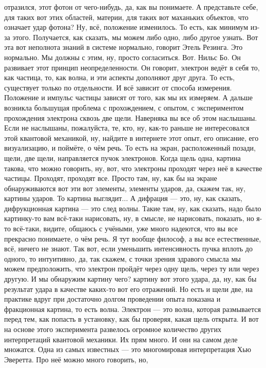отразился, этот фотон от чего-нибудь, да, как вы понимаете. А представьте себе,
для таких вот этих областей, материи, для таких вот маханьких объектов, что
означает удар фотона? Ну, всё, положение изменилось. То есть, как минимум из-за
этого. Получается, как сказать, мы можем либо одно, либо другое узнать. Вот эта
вот неполнота знаний в системе нормально, говорит Этель Резинга. Это нормально.
Мы должны с этим, ну, просто согласиться. Вот. Нильс Бо. Он развивает этот
принцип неопределенности. Он говорит, электрон ведёт в себя то, как частица, то,
как волна, и эти аспекты дополняют друг друга. То есть, существует только по
отдельности. И всё зависит от способа измерения. Положение и импульс частицы
зависят от того, как мы их измеряем. А дальше возникла большущая проблема с
прохождением, с опытом, с экспериментом прохождения электрона сквозь две щели.
Наверняка вы все об этом наслышаны. Если не наслышаны, пожалуйста, те, кто, ну,
как-то раньше не интересовался этой квантовой механикой, ну, найдите в интернете
этот опыт, его описание, его визуализацию, и поймёте, о чём речь. То есть на
экран, расположенный позади, щели, две щели, направляется пучок электронов.
Когда щель одна, картина такова, что можно говорить, ну, вот, что электроны
проходят через неё в качестве частицы. Проходят, проходят все. Просто там, ну,
как бы на экране обнаруживаются вот эти вот элементы, элементы ударов, да,
скажем так, ну, картины ударов. То картина выглядит... А дифрация — это, ну, как
сказать, дифрукционная картина — это след волны. Такие там, ну, как сказать,
надо было картинку-то вам всё-таки нарисовать, ну, в смысле, не нарисовать,
показать, но я-то всё-таки, видите, общаюсь с учёными, уже много надеются, что
вы все прекрасно понимаете, о чём речь. Я тут вообще философ, а вы все
естественные, всё, ничего не знают. Так вот, если уменьшить интенсивность пучка
вплоть до одного, то интуитивно, да, так скажем, с точки зрения здравого смысла
мы можем предположить, что электрон пройдёт через одну щель, через ту или через
другую. И мы обнаружим картину чего? картину вот этого удара, да, ну, как бы
результат удара в качестве каких-то вот его отражений. Но есть и щели две, на
практике вдруг при достаточно долгом проведении опыта показана и фракционная
картина, то есть волна. Электрон — это волна, которая размывается перед тем, как
попасть в установку, как бы проверяя, какая щель открыта. И вот на основе этого
эксперимента развелось огромное количество других интерпретаций квантовой
механики. Их прям много. И они на самом деле множатся. Одна из самых известных —
это многомировая интерпретация Хью Эверетта. Про неё можно много говорить, но,
